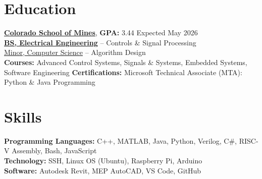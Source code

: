 \documentclass[11pt]{article}       %
\begin{document}
\vspace{-18 pt}
\section*{Education}
\vspace{5pt}

\textbf{\href{https://www.mines.edu/}{Colorado School of Mines}}, \textbf{GPA:} 3.44  \hfill Expected May 2026\\
\textbf{\href{https://electrical.mines.edu/undergraduate-program/}{BS, Electrical Engineering}} -- Controls \& Signal Processing  \\
\href{https://cs.mines.edu/csmines-minors-and-areas-of-special-interest/}{Minor, Computer Science} -- Algorithm Design\\
\textbf{Courses:} Advanced Control Systems, Signals \& Systems, Embedded Systems, Software Engineering
\textbf{Certifications:} Microsoft Technical Associate (MTA): Python \& Java Programming

\section*{Skills}
\vspace{5pt}

\textbf{Programming Languages:} C++, MATLAB, Java, Python, Verilog, C\#, RISC-V Assembly, Bash, JavaScript \\
\textbf{Technology:} SSH, Linux OS (Ubuntu), Raspberry Pi, Arduino \\
\textbf{Software:} Autodesk Revit, MEP AutoCAD, VS Code, GitHub \\
\end{document}
